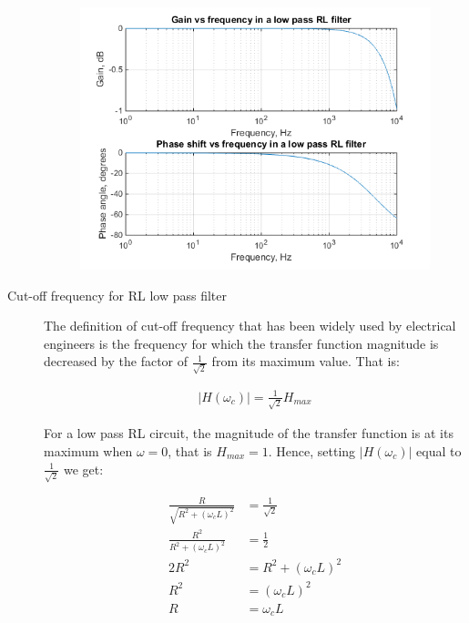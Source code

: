 \documentclass{article}
\begin{document}
\begin{description}
\begin{center}
	\begin{figure}[H]
		\begin{minipage}{0.6\textwidth}
			\includegraphics[scale=0.8]{bode2}
		\end{minipage}
	\end{figure}
\end{center}

\item[Cut-off frequency for RL low pass filter]
The definition of cut-off frequency that has been widely used by electrical engineers is the frequency for which the transfer function magnitude is decreased by the factor of $\frac{1}{\sqrt{2}}$ from its maximum value. That is:

\begin{align*}
|H(\omega_c)| = \frac{1}{\sqrt{2}}H_{max}
\end{align*}

For a low pass RL circuit, the magnitude of the transfer function is at its maximum when $\omega = 0$, that is $H_{max} = 1$. Hence, setting $|H(\omega_c)|$ equal to $\frac{1}{\sqrt{2}}$ we get:

\begin{align*}
\frac{R}{\sqrt{R^2 + (\omega_c L)^2}} &= \frac{1}{\sqrt{2}} \\
\frac{R^2}{R^2 + (\omega_c L)^2} &= \frac{1}{2} \\
2R^2 &= R^2 + (\omega_c L)^2 \\
R^2 &= (\omega_c L)^2 \\
R &= \omega_c L
\end{align*}


\end{description}
\end{document}
